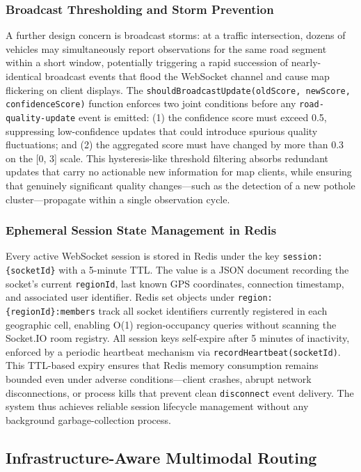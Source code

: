 \documentclass[conference]{IEEEtran}
\begin{document}
\subsubsection{Broadcast Thresholding and Storm Prevention}
A further design concern is broadcast storms: at a traffic intersection, dozens of vehicles may simultaneously report observations for the same road segment within a short window, potentially triggering a rapid succession of nearly-identical broadcast events that flood the WebSocket channel and cause map flickering on client displays.
The \texttt{shouldBroadcastUpdate(oldScore, newScore, confidenceScore)} function enforces two joint conditions before any \texttt{road-quality-update} event is emitted: (1) the confidence score must exceed 0.5, suppressing low-confidence updates that could introduce spurious quality fluctuations;
and (2) the aggregated score must have changed by more than 0.3 on the [0, 3] scale.
This hysteresis-like threshold filtering absorbs redundant updates that carry no actionable new information for map clients, while ensuring that genuinely significant quality changes---such as the detection of a new pothole cluster---propagate within a single observation cycle.

\subsubsection{Ephemeral Session State Management in Redis}
Every active WebSocket session is stored in Redis under the key \texttt{session:\{socketId\}} with a 5-minute TTL.
The value is a JSON document recording the socket's current \texttt{regionId}, last known GPS coordinates, connection timestamp, and associated user identifier.
Redis set objects under \texttt{region:\{regionId\}:members} track all socket identifiers currently registered in each geographic cell, enabling O(1) region-occupancy queries without scanning the Socket.IO room registry.
All session keys self-expire after 5 minutes of inactivity, enforced by a periodic heartbeat mechanism via \texttt{recordHeartbeat(socketId)}.
This TTL-based expiry ensures that Redis memory consumption remains bounded even under adverse conditions---client crashes, abrupt network disconnections, or process kills that prevent clean \texttt{disconnect} event delivery. The system thus achieves reliable session lifecycle management without any background garbage-collection process.

\subsection{Infrastructure-Aware Multimodal Routing}
\end{document}
